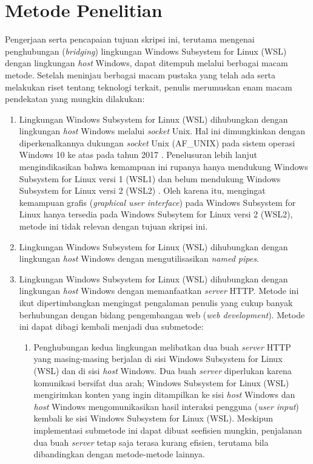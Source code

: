 \chapter{Metode Penelitian}

Pengerjaan serta pencapaian tujuan skripsi ini, terutama mengenai penghubungan (\textit{bridging}) lingkungan Windows Subsystem for Linux (WSL) dengan lingkungan \textit{host} Windows, dapat ditempuh melalui berbagai macam metode. Setelah meninjau berbagai macam pustaka yang telah ada serta melakukan riset tentang teknologi terkait, penulis merumuskan enam macam pendekatan yang mungkin dilakukan:
\begin{enumerate}
    \item Lingkungan Windows Subsystem for Linux (WSL) dihubungkan dengan lingkungan \textit{host} Windows melalui \textit{socket} Unix. Hal ini dimungkinkan dengan diperkenalkannya dukungan \textit{socket} Unix (AF\_UNIX) pada sistem operasi Windows 10 ke atas pada tahun 2017 \cite{bringing-afunix-to-windows}. Penelusuran lebih lanjut mengindikasikan bahwa kemampuan ini rupanya hanya mendukung Windows Subsystem for Linux versi 1 (WSL1) dan belum mendukung Windows Subsystem for Linux versi 2 (WSL2) \cite{github-issues-afunix-not-supported-in-wsl2}. Oleh karena itu, mengingat kemampuan grafis (\textit{graphical user interface}) pada Windows Subsystem for Linux hanya tersedia pada Windows Subsytem for Linux versi 2 (WSL2), metode ini tidak relevan dengan tujuan skripsi ini.
    \item Lingkungan Windows Subsystem for Linux (WSL) dihubungkan dengan lingkungan \textit{host} Windows dengan mengutilisasikan \textit{named pipes}.
    \item Lingkungan Windows Subsystem for Linux (WSL) dihubungkan dengan lingkungan \textit{host} Windows dengan memanfaatkan \textit{server} HTTP. Metode ini ikut dipertimbangkan mengingat pengalaman penulis yang cukup banyak berhubungan dengan bidang pengembangan web (\textit{web development}). Metode ini dapat dibagi kembali menjadi dua submetode:
    \begin{enumerate}
        \item Penghubungan kedua lingkungan melibatkan dua buah \textit{server} HTTP yang masing-masing berjalan di sisi Windows Subsystem for Linux (WSL) dan di sisi \textit{host} Windows. Dua buah \textit{server} diperlukan karena komunikasi bersifat dua arah; Windows Subsystem for Linux (WSL) mengirimkan konten yang ingin ditampilkan ke sisi \textit{host} Windows dan \textit{host} Windows mengomunikasikan hasil interaksi pengguna (\textit{user input}) kembali ke sisi Windows Subsystem for Linux (WSL). Meskipun implementasi submetode ini dapat dibuat seefisien mungkin, penjalanan dua buah \textit{server} tetap saja terasa kurang efisien, terutama bila dibandingkan dengan metode-metode lainnya.

\end{enumerate}
\end{enumerate}
